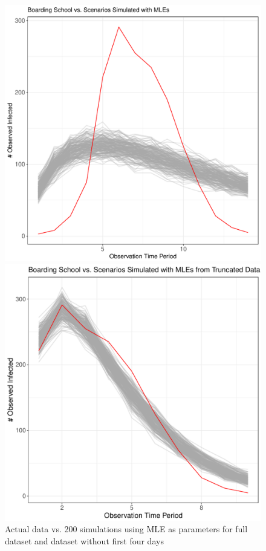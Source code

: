 \documentclass{svproc}
\begin{document}
\begin{figure}
\centering
\begin{minipage}{.4\textwidth}
\includegraphics[width=1\linewidth]{LackOfFit.pdf}
\end{minipage}%
\begin{minipage}{.4\textwidth}

\centering
\includegraphics[width=1\linewidth]{BetterFit.pdf}
\end{minipage}
\caption{Actual data vs. 200 simulations using MLE as parameters for full dataset and dataset without first four days}
\label{plot1}
\end{figure}
\end{document}
